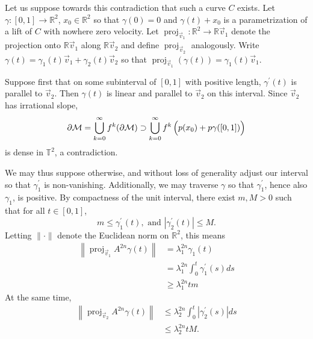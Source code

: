 \documentclass{article}
\def\R{\mathbb{R}}
\def\T{\mathbb{T}}
\def\M{\mathcal{M}}
\newcommand{\abs}[1]{\left\vert{#1}\right\vert}
\newcommand{\norm}[1]{\left\|{#1}\right\|}
\DeclareMathOperator{\proj}{proj}
\begin{document}
Let us suppose towards this contradiction that such a curve $C$ exists. Let $\gamma:[0,1]\to \R^2$, $x_0 \in \R^2$ so that $\gamma(0) = 0$ and $\gamma(t) + x_0$ is a parametrization of a lift of $C$ with nowhere zero velocity. Let $\proj_{\vec v_1}: \R^2 \to \R \vec v_1$ denote the projection onto $\R \vec v_1$ along $\R \vec v_2$ and define $\proj_{\vec v_2}$ analogously. Write $\gamma(t) = \gamma_1(t)\vec v_1 + \gamma_2(t) \vec v_2$ so that $\proj_{\vec v_1}(\gamma(t)) = \gamma_1(t) \vec v_1$.

Suppose first that on some subinterval of $[0,1]$ with positive length, $\gamma^\prime(t)$ is parallel to $\vec v_2$. Then $\gamma(t)$ is linear and parallel to $\vec v_2$ on this interval. Since $\vec v_2$ has irrational slope,  $$\partial\M=\bigcup_{k=0}^\infty f^k(\partial\M)\supset \bigcup_{k=0}^\infty f^k\left( \vphantom{\prod} p(x_0) +  p\gamma([0,1])\right)$$ is dense in $\T^2$, a contradiction. 

We may thus suppose otherwise, and without loss of generality adjust our interval so that $\gamma_1^\prime$ is non-vanishing. Additionally, we may traverse $\gamma$ so that $\gamma^\prime_1$, hence also $\gamma_1$, is positive. By compactness of the unit interval, there exist $m, M > 0$ such that for all $t\in [0,1]$,
$$
    m \leq \gamma_1^\prime(t), \text{ and } \abs{\gamma_2^\prime(t)} \leq M.
$$
Letting $\|\cdot\|$ denote the Euclidean norm on $\R^2$, this means
\begin{align*}
    \norm{\proj_{\vec v_1}A^{2n}\gamma(t)} & =\lambda_1^{2n} \gamma_1(t) \\
    & = \lambda_1^{2n} \int_0^{t} \gamma_1^\prime(s)ds\\
    & \geq \lambda_{1}^{2n} t m
\end{align*}
At the same time,
\begin{align*}
    \norm{\proj_{\vec v_2}A^{2n}\gamma(t)} &\le \lambda_2^{2n}\int_0^{t} \abs{\gamma_2^\prime(s)}ds\\
    &\leq \lambda_2^{2n} t M.
\end{align*}
\end{document}
